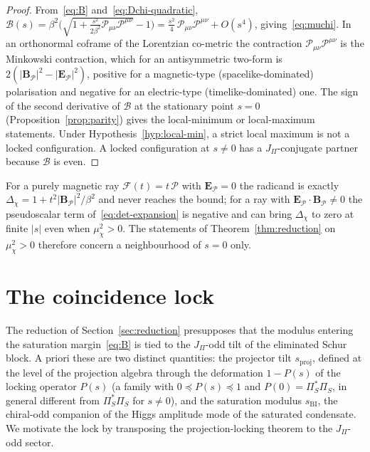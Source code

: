 \documentclass[11pt]{article}
\theoremstyle{definition}
\theoremstyle{remark}
\newcommand{\JPi}{J_{\Pi}}
\newcommand{\Fchi}{\mathcal{F}}
\newcommand{\Pchi}{\mathcal{P}}
\newcommand{\Bsat}{\mathcal{B}}
\newcommand{\Dchi}{\Delta_{\chi}}
\newcommand{\muchi}{\mu_{\chi}^{2}}
\begin{document}
    \begin{proof}
      From~\eqref{eq:B} and~\eqref{eq:Dchi-quadratic},
      $\Bsat(s) = \beta^2 \big( \sqrt{1 + \tfrac{s^2}{2\beta^2} \Pchi_{\mu\nu} \Pchi^{\mu\nu}} - 1 \big)
      = \tfrac{s^2}{4}\, \Pchi_{\mu\nu} \Pchi^{\mu\nu} + O(s^4)$, giving~\eqref{eq:muchi}.
      In an orthonormal coframe of the Lorentzian co-metric the contraction $\Pchi_{\mu\nu} \Pchi^{\mu\nu}$ is the
      Minkowski contraction, which for an antisymmetric two-form is
      $2(|\mathbf{B}_{\mathcal P}|^2 - |\mathbf{E}_{\mathcal P}|^2)$,
      positive for a magnetic-type (spacelike-dominated) polarisation and negative for an electric-type
      (timelike-dominated) one.
      The sign of the second derivative of $\Bsat$ at the stationary point $s=0$ (Proposition~\ref{prop:parity}) gives
      the local-minimum or local-maximum statements.
      Under Hypothesis~\ref{hyp:local-min}, a strict local maximum is not a locked configuration.
      A locked configuration at $s\neq0$ has a $\JPi$-conjugate partner because $\Bsat$ is even.
    \end{proof}

    For a purely magnetic ray $\Fchi(t)=t\,\Pchi$ with $\mathbf{E}_{\mathcal P}=0$ the radicand is exactly
    $\Dchi=1+t^2|\mathbf{B}_{\mathcal P}|^2/\beta^2$ and never reaches the bound; for a ray with
    $\mathbf{E}_{\mathcal P}\cdot\mathbf{B}_{\mathcal P}\neq0$ the pseudoscalar term of~\eqref{eq:det-expansion} is
    negative and can bring $\Dchi$ to zero at finite $|s|$ even when $\muchi>0$.
    The statements of Theorem~\ref{thm:reduction} on $\muchi>0$ therefore concern a neighbourhood of $s=0$ only.

  \section{The coincidence lock}
    \label{sec:coincidence}

    The reduction of Section~\ref{sec:reduction} presupposes that the modulus entering the saturation
    margin~\eqref{eq:B} is tied to the $\JPi$-odd tilt of the eliminated Schur block.
    A priori these are two distinct quantities: the projector tilt $s_{\mathrm{proj}}$, defined at the level of the
    projection algebra through the deformation $1 - P(s)$ of the locking operator $P(s)$ (a family with $0\preceq
    P(s)\preceq1$
    and $P(0)=\Pi_S^*\Pi_S$, in general different from $\Pi_S^*\Pi_S$ for $s\neq0$), and the
    saturation
    modulus $s_{\mathrm{BI}}$, the chiral-odd companion of the Higgs amplitude mode of the saturated condensate.
    We motivate the lock by transposing the projection-locking theorem to the $\JPi$-odd sector.
\end{document}
